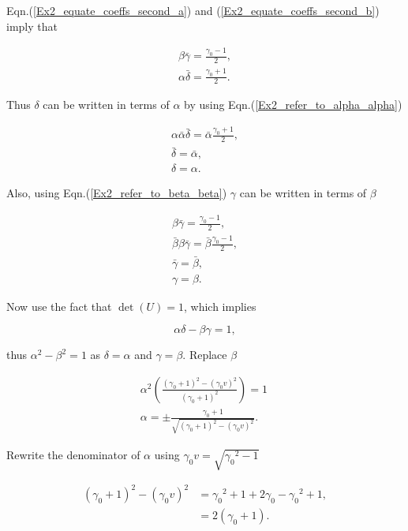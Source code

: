 \noindent Eqn.(\ref{Ex2_equate_coeffs_second_a}) and (\ref{Ex2_equate_coeffs_second_b}) imply that

\begin{align*}
\beta \bar{\gamma} = \frac{\gamma_0 - 1}{2}, \\
\alpha \bar{\delta} = \frac{\gamma_0 + 1}{2}.
\end{align*}

Thus $\delta$ can be written in terms of $\alpha$ by using Eqn.(\ref{Ex2_refer_to_alpha_alpha})

\begin{gather*}
\alpha \bar{\alpha} \bar{\delta} = \bar{\alpha} \frac{\gamma_0 + 1}{2}, \\
\bar{\delta} = \bar{\alpha}, \\
\delta = \alpha. 
\end{gather*}

Also, using Eqn.(\ref{Ex2_refer_to_beta_beta}) $\gamma$ can be written in terms of $\beta$

\begin{gather*}
\beta \bar{\gamma} = \frac{\gamma_0 - 1}{2},\\
\bar{\beta} \beta \bar{\gamma} = \bar{\beta} \frac{\gamma_0 - 1}{2},\\
\bar{\gamma} = \bar{\beta}, \\
\gamma = \beta.
\end{gather*}

\noindent  Now use the fact that $\det{(U)} = 1$, which implies

\begin{equation*}
\alpha \delta - \beta \gamma = 1,
\end{equation*}

\noindent thus $\alpha^2 - \beta^2 = 1$ as $\delta = \alpha$ and $\gamma = \beta$. Replace $\beta$

\begin{gather*}
\alpha^2\left( \frac{(\gamma_0 + 1)^2 - (\gamma_0 v)^2}{(\gamma_0 + 1)^2}   \right) = 1\ \\
\alpha = \pm \frac{\gamma_0 + 1}{\sqrt{(\gamma_0 + 1)^2 - (\gamma_0 v)^2}}.
\end{gather*}

\noindent Rewrite the denominator of $\alpha$ using $\gamma_0 v = \sqrt{{\gamma_0}^{2} - 1}$

\begin{align*}
(\gamma_0 + 1)^2 - (\gamma_0 v)^2 & = {\gamma_0}^{2} + 1 + 2\gamma_0 - {\gamma_0}^{2} + 1, \\
                                  & = 2(\gamma_0 + 1).
\end{align*}


